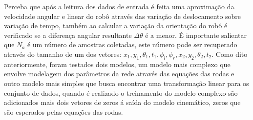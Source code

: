 Perceba que após a leitura dos dados de entrada é feita uma aproximação da
velocidade angular e linear do robô através das variação de deslocamento
sobre variação de tempo, também ao calcular a variação da orientação do robô
é verificado se a diferença angular resultante $\Delta \theta$ é a menor.
 É importante salientar que $N_a$
é um número de amostras coletadas, este número pode ser recuperado através
do tamanho de um dos vetores: $x_1,y_1,\theta_{1},t_1,\phi_l,\phi_r,x_2,y_2,\theta_{2},t_2$.
Como dito anteriormente, foram testados dois modelos, um modelo mais complexo
que envolve modelagem dos parâmetros da rede através das equações das rodas
e outro modelo mais simples que busca encontrar uma transformação linear
para os conjunto de dados, quando é realizado o treinamento do modelo complexo
são adicionados mais dois vetores de zeros á saída do modelo cinemático, zeros
que são esperados pelas equações das rodas. 